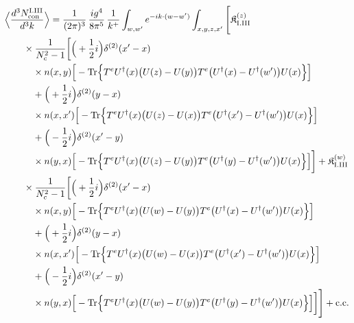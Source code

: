 \begin{align}\label{eq:S-I.III-2}
&\Big\langle\frac{d^{3}N^{\rm I.III}_{{\rm con}}}{d^{3}k}\Big\rangle=\frac{1}{(2\pi)^{3}}\, \frac{ig^{4}}{8\pi^{5}}\, \frac{1}{k^{+}} \int_{w,w'}e^{-ik\cdot(w-w')} \int_{x,y,z,x'}\Bigg[ \mathfrak{K}^{(z)}_{\rm I.III}\notag\\
&\quad\quad \times \frac{1}{N_{c}^{2}-1}\bigg[\Big(+\frac{1}{2}i\Big)\delta^{(2)}(x'-x)\notag\\
&\quad\quad\quad \times n(x,y)\Big[-{\rm Tr}\Big\{T^{e}U^{\dagger}(x)\big(U(z)-U(y)\big)T^{e}\big(U^{\dagger}(x)-U^{\dagger}(w')\big)U(x)\Big\}\Big]\notag\\
&\quad\quad\quad +\Big(+\frac{1}{2}i\Big)\delta^{(2)}(y-x)\notag\\
&\quad\quad\quad \times n(x,x')\Big[-{\rm Tr}\Big\{T^{e}U^{\dagger}(x)\big(U(z)-U(x)\big)T^{e}\big(U^{\dagger}(x')-U^{\dagger}(w')\big)U(x)\Big\}\Big]\notag\\
&\quad\quad\quad +\Big(-\frac{1}{2}i\Big)\delta^{(2)}(x'-y)\notag\\
&\quad\quad\quad \times n(y,x)\Big[-{\rm Tr}\Big\{T^{e}U^{\dagger}(x)\big(U(z)-U(y)\big)T^{e}\big(U^{\dagger}(y)-U^{\dagger}(w')\big)U(x)\Big\}\Big]\bigg] + \mathfrak{K}^{(w)}_{\rm I.III}\notag\\
&\quad\quad \times \frac{1}{N_{c}^{2}-1}\bigg[\Big(+\frac{1}{2}i\Big)\delta^{(2)}(x'-x)\notag\\
&\quad\quad\quad \times n(x,y)\Big[-{\rm Tr}\Big\{T^{e}U^{\dagger}(x)\big(U(w)-U(y)\big)T^{e}\big(U^{\dagger}(x)-U^{\dagger}(w')\big)U(x)\Big\}\Big]\notag\\
&\quad\quad\quad +\Big(+\frac{1}{2}i\Big)\delta^{(2)}(y-x)\notag\\
&\quad\quad\quad \times n(x,x')\Big[-{\rm Tr}\Big\{T^{e}U^{\dagger}(x)\big(U(w)-U(x)\big)T^{e}\big(U^{\dagger}(x')-U^{\dagger}(w')\big)U(x)\Big\}\Big]\notag\\
&\quad\quad\quad +\Big(-\frac{1}{2}i\Big)\delta^{(2)}(x'-y)\notag\\
&\quad\quad\quad \times n(y,x)\Big[-{\rm Tr}\Big\{T^{e}U^{\dagger}(x)\big(U(w)-U(y)\big)T^{e}\big(U^{\dagger}(y)-U^{\dagger}(w')\big)U(x)\Big\}\Big]\bigg]\Bigg] +{\rm c.c.}
\end{align}
